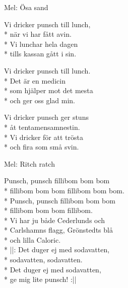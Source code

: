 \begin{SongText}[Studiemedelsrundo v2]
    \begin{SongInfo}
        Mel: Ösa sand
    \end{SongInfo}
    \begin{SongVerse}
        Vi dricker punsch till lunch,\\*%
        när vi har fått avin.\\*%
        Vi lunchar hela dagen\\*%
        tills kassan gått i sin.
    \end{SongVerse}
    \begin{SongVerse}
        Vi dricker punsch till lunch.\\*%
        Det är en medicin\\*%
        som hjälper mot det mesta\\*%
        och ger oss glad min.
    \end{SongVerse}
    \begin{SongVerse}
        Vi dricker punsch ger stuns\\*%
        åt tentamensamnestin.\\*%
        Vi dricker för att trösta\\*%
        och fira som små svin.
    \end{SongVerse}\end{SongText}
\begin{SongText}
    \begin{SongInfo}
        Mel: Ritch ratch
    \end{SongInfo}
    \begin{SongVerse}
        Punsch, punsch fillibom bom bom\\*%
        fillibom bom bom fillibom bom bom.\\*%
        Punsch, punsch fillibom bom bom\\*%
        fillibom bom bom fillibom.\\*%
        Vi har ju både Cederlunds och\\*%
        Carlshamns flagg, Grönstedts blå\\*%
        och lilla Caloric.\\*%
        ||: Det duger ej med sodavatten,\\*%
        sodavatten, sodavatten.\\*%
        Det duger ej med sodavatten,\\*%
        ge mig lite punsch! :||
    \end{SongVerse}\end{SongText}
